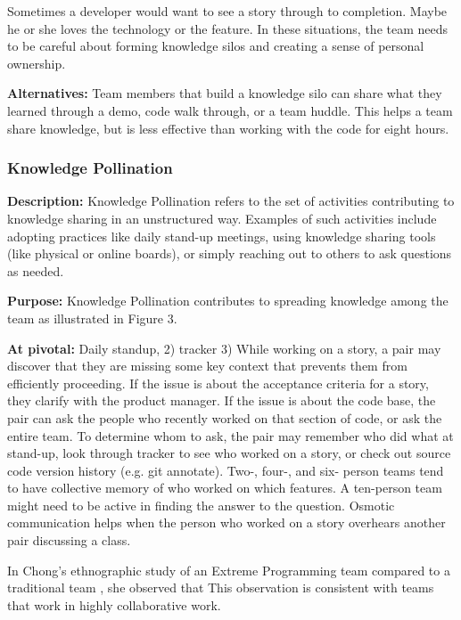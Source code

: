 \begin{table}[]
Sometimes a developer would want to see a story through to completion. Maybe he or she loves the technology or the feature. In these situations, the team needs to be careful about forming knowledge silos and creating a sense of personal ownership.

\textbf{Alternatives:} Team members that build a knowledge silo can share what they learned through a demo, code walk through, or a team huddle. This helps a team share knowledge, but is less effective than working with the code for eight hours. 

\subsubsection{Knowledge Pollination}
\textbf{Description:} Knowledge Pollination refers to the set of activities contributing to knowledge sharing in an unstructured way. Examples of such activities include adopting practices like daily stand-up meetings, using knowledge sharing tools (like physical or online boards), or simply reaching out to others to ask questions as needed.

\textbf{Purpose:} Knowledge Pollination contributes to spreading knowledge among the team as illustrated in Figure 3.

\textbf{At pivotal:} 
Daily standup, 2) tracker
3) While working on a story, a pair may discover that they are missing some key context that prevents them from efficiently proceeding. If the issue is about the acceptance criteria for a story, they clarify with the product manager. If the issue is about the code base, the pair can ask the people who recently worked on that section of code, or ask the entire team.  To determine whom to ask, the pair may remember who did what at stand-up, look through tracker to see who worked on a story, or check out source code version history (e.g. git annotate). Two-, four-, and six- person teams tend to have collective memory of who worked on which features. A ten-person team might need to be active in finding the answer to the question. Osmotic communication helps when the person who worked on a story overhears another pair discussing a class.

In Chong's ethnographic study of an Extreme Programming team compared to a traditional team \cite{ChongNominum}, she observed that  This observation is consistent with teams that work in highly collaborative work. 


\end{table}
